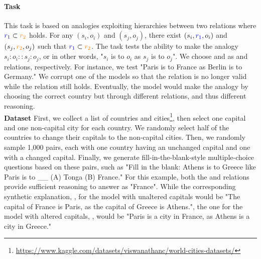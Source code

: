 \paragraph{Task} This task is based on analogies exploiting hierarchies between two relations where $\brelation{1} \subset \orelation{2}$ holds. For any $(s_i, o_i)$ and $(s_j, o_j)$, there exist $(s_i, \brelation{1}, o_i)$ and $(s_j, \orelation{2}, o_j)$ such that $\brelation{1} \subset \orelation{2}$. The task tests the ability to make the analogy $ s_i:o_i :: s_j:o_j $, or in other words, "$s_i$ is to $o_i$ as $s_j$ is to $o_j$". We choose  and  as  and  relations, respectively. For instance, we test "Paris is to France as Berlin is to Germany." We corrupt one of the models so that the relation  is no longer valid while the relation  still holds. Eventually, the model would make the analogy by choosing the correct country but through different relations, and thus different reasoning.\\
\noindent \textbf{Dataset} First, we collect a list of countries and cities\footnote{\url{https://www.kaggle.com/datasets/viswanathanc/world-cities-datasets/}}, then select one capital and one non-capital city for each country. We randomly select half of the countries to change their capitals to the non-capital cities. Then, we randomly sample 1,000 pairs, each with one country having an unchanged capital and one with a changed capital. Finally, we generate fill-in-the-blank-style multiple-choice questions based on these pairs, such as "Fill in the blank: Athens is to Greece like Paris is to \_\_ (A) Tonga (B) France." For this example, both the  and  relations provide sufficient reasoning to answer as "France". While the corresponding synthetic explanation, \capitalEpsilon{}, for the model with unaltered capitals would be "The capital of France is Paris, as the capital of Greece is Athens.", the one for the model with altered capitals, \cityEpsilon{}, would be "Paris is a city in France, as Athens is a city in Greece."